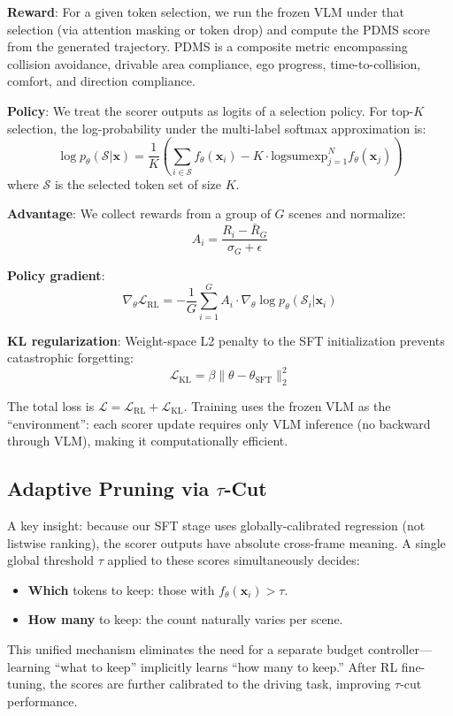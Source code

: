 \documentclass[letterpaper]{article} %
\begin{document}
\textbf{Reward}: For a given token selection, we run the frozen VLM under that selection (via attention masking or token drop) and compute the PDMS score from the generated trajectory.
PDMS is a composite metric encompassing collision avoidance, drivable area compliance, ego progress, time-to-collision, comfort, and direction compliance.

\textbf{Policy}: We treat the scorer outputs as logits of a selection policy.
For top-$K$ selection, the log-probability under the multi-label softmax approximation is:
\begin{equation}
\log p_\theta(\mathcal{S} | \mathbf{x}) = \frac{1}{K}\left(\sum_{i \in \mathcal{S}} f_\theta(\mathbf{x}_i) - K \cdot \text{logsumexp}_{j=1}^N f_\theta(\mathbf{x}_j)\right)
\end{equation}
where $\mathcal{S}$ is the selected token set of size $K$.

\textbf{Advantage}: We collect rewards from a group of $G$ scenes and normalize:
\begin{equation}
A_i = \frac{R_i - \bar{R}_G}{\sigma_G + \epsilon}
\end{equation}

\textbf{Policy gradient}:
\begin{equation}
\nabla_\theta \mathcal{L}_\text{RL} = -\frac{1}{G}\sum_{i=1}^{G} A_i \cdot \nabla_\theta \log p_\theta(\mathcal{S}_i | \mathbf{x}_i)
\end{equation}

\textbf{KL regularization}: Weight-space L2 penalty to the SFT initialization prevents catastrophic forgetting:
\begin{equation}
\mathcal{L}_\text{KL} = \beta \|\theta - \theta_\text{SFT}\|_2^2
\end{equation}

The total loss is $\mathcal{L} = \mathcal{L}_\text{RL} + \mathcal{L}_\text{KL}$.
Training uses the frozen VLM as the ``environment'': each scorer update requires only VLM inference (no backward through VLM), making it computationally efficient.

\subsection{Adaptive Pruning via $\tau$-Cut}
\label{sec:taucut}

A key insight: because our SFT stage uses globally-calibrated regression (not listwise ranking), the scorer outputs have absolute cross-frame meaning.
A single global threshold $\tau$ applied to these scores simultaneously decides:
\begin{itemize}[nosep,leftmargin=*]
\item \textbf{Which} tokens to keep: those with $f_\theta(\mathbf{x}_i) > \tau$.
\item \textbf{How many} to keep: the count naturally varies per scene.
\end{itemize}
This unified mechanism eliminates the need for a separate budget controller---learning ``what to keep'' implicitly learns ``how many to keep.''
After RL fine-tuning, the scores are further calibrated to the driving task, improving $\tau$-cut performance.
\end{document}
